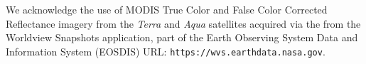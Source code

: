 \documentclass[review, jog]{igs}
\begin{document}
We acknowledge the use of MODIS True Color and False Color Corrected Reflectance imagery from the \textit{Terra} and \textit{Aqua} satellites acquired via the from the Worldview Snapshots application, part of the Earth Observing System Data and Information System (EOSDIS) URL: {\texttt{https://wvs.earthdata.nasa.gov}}. 


\end{document}
